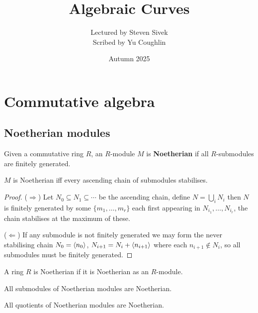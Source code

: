 \documentclass{article}
\begin{document}
\title{Algebraic Curves}
\author{Lectured by Steven Sivek \\
Scribed by Yu Coughlin}
\date{Autumn 2025}

\maketitle

\tableofcontents

\appendix

\section{Commutative algebra}

\subsection{Noetherian modules}

\begin{definition}
    Given a commutative ring $R$, an $R$-module $M$ is \textbf{Noetherian} if all $R$-submodules are finitely generated.
\end{definition}

\begin{proposition}
    $M$ is Noetherian iff every ascending chain of submodules stabilises.
    \begin{proof}
        ($\Rightarrow$) Let $N_0\subseteq N_1 \subseteq \cdots$ be the ascending chain, define $N = \bigcup_i N_i$ then $N$ is finitely generated by some $\{m_1,\ldots,m_r\}$ each first appearing in $N_{i_1},\ldots,N_{i_r}$, the chain stabilises at the maximum of these.

        ($\Leftarrow$) If any submodule is not finitely generated we may form the never stabilising chain $N_0 = \left\langle n_0 \right\rangle$, $N_{i+1} = N_i + \left\langle n_{i+1} \right\rangle$ where each $n_{i+1}\notin N_i$, so all submodules must be finitely generated.
    \end{proof}
\end{proposition}

\begin{definition}
    A ring $R$ is Noetherian if it is Noetherian as an $R$-module.
\end{definition}

\begin{lemma}
    All submodules of Noetherian modules are Noetherian.
\end{lemma}

\begin{lemma}
    All quotients of Noetherian modules are Noetherian.
\end{lemma}
\end{document}
